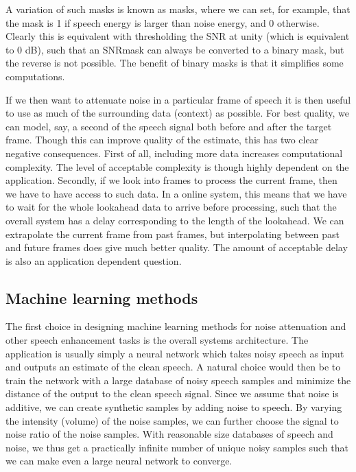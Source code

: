 \documentclass[letterpaper,10pt,english]{jupyterBook}
\begin{document}
\sphinxAtStartPar
A variation of such masks is known as  masks, where we can set,
for example, that the mask is 1 if speech energy is larger than noise
energy, and 0 otherwise. Clearly this is equivalent with thresholding
the SNR at unity (which is equivalent to 0 dB), such that an SNR\sphinxhyphen{}mask
can always be converted to a binary mask, but the reverse is not
possible. The benefit of binary masks is that it simplifies some
computations.

\sphinxAtStartPar
If we then want to attenuate noise in a particular frame of speech it is
then useful to use as much of the surrounding data (context) as
possible. For best quality, we can model, say, a second of the speech
signal both before and after the target frame. Though this can improve
quality of the estimate, this has two clear negative consequences. First
of all, including more data increases computational complexity. The
level of acceptable complexity is though highly dependent on the
application. Secondly, if we look into  frames to process the
current frame, then we have to have access to such data. In a on\sphinxhyphen{}line
system, this means that we have to wait for the whole look\sphinxhyphen{}ahead data to
arrive before processing, such that the overall system has a delay
corresponding to the length of the look\sphinxhyphen{}ahead. We can extrapolate the
current frame from past frames, but interpolating between past and
future frames does give much better quality. The amount of acceptable
delay is also an application dependent question.


\subsection{Machine learning methods}
\label{\detokenize{Enhancement/Noise_attenuation:machine-learning-methods}}
\sphinxAtStartPar
The first choice in designing machine learning methods for noise
attenuation and other speech enhancement tasks is the overall systems
architecture. The application is usually simply a neural network which
takes noisy speech as input and outputs an estimate of the clean speech.
A natural choice would then be to train the network with a large
database of noisy speech samples and minimize the distance of the output
to the clean speech signal. Since we assume that noise is additive, we
can create synthetic samples by adding noise to speech. By varying the
intensity (volume) of the noise samples, we can further choose the
signal to noise ratio of the noise samples. With reasonable size
databases of speech and noise, we thus get a practically infinite number
of unique noisy samples such that we can make even a large neural
network to converge.
\end{document}
